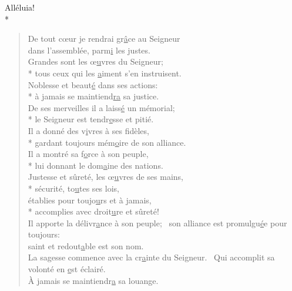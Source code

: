 Alléluia! \\*
\begin{verse}
De tout cœur je rendrai gr\underline{â}ce au Seigneur \\
dans l’assemblée, parm\underline{i} les justes. \\
Grandes sont les œ\underline{u}vres du Seigneur; \\*
tous ceux qui les \underline{a}iment s’en instruisent. \\
Noblesse et beaut\underline{é} dans ses actions: \\*
à jamais se maintiend\underline{ra} sa justice. \\

De ses merveilles il a laiss\underline{é} un mémorial; \\*
le Seigneur est tendr\underline{e}sse et pitié. \\
Il a donné des v\underline{i}vres à ses fidèles, \\*
gardant toujours mém\underline{o}ire de son alliance. \\
Il a montré sa f\underline{o}rce à son peuple, \\*
lui donnant le dom\underline{a}ine des nations. \\

Justesse et sûreté, les œ\underline{u}vres de ses mains, \\*
sécurité, to\underline{u}tes ses lois, \\
établies pour toujo\underline{u}rs et à jamais, \\*
accomplies avec droit\underline{u}re et sûreté! \\

Il apporte la délivr\underline{a}nce à son peuple;~\psalmdagger
son alliance est promulgu\underline{é}e pour toujours: \\
saint et redout\underline{a}ble est son nom. \\

La sagesse commence avec la cr\underline{a}inte du Seigneur.~\psalmdagger
Qui accomplit sa volonté en \underline{e}st éclairé. \\
À jamais se maintiendr\underline{a} sa louange. \\
\end{verse}

